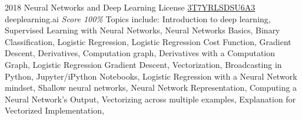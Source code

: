 \documentclass[11pt,a4paper]{moderncv}
\begin{document}
\cventry
    {2018}
    {Neural Networks and Deep Learning}
    {License
        \href{https://www.coursera.org/account/accomplishments/records/T7YRLSDSU6A}
        {3T7YRLSDSU6A3}
    }
    {deeplearning.ai}
    {\textit{Score 100\%}}
    {
        Topics include:                                                          %
            Introduction to deep learning,                                                          %
            Supervised Learning with Neural Networks,                                                          %
            Neural Networks Basics,                                                          %
            Binary Classification,                                                          %
            Logistic Regression,                                                          %
            Logistic Regression Cost Function,                                                          %
            Gradient Descent,                                                          %
            Derivatives,                                                          %
            Computation graph,                                                          %
            Derivatives with a Computation Graph,                                                          %
            Logistic Regression Gradient Descent,                                                          %
            Vectorization,                                                          %
            Broadcasting in Python,                                                          %
            Jupyter/iPython Notebooks,                                                          %
            Logistic Regression with a Neural Network mindset,                                                          %
            Shallow neural networks,                                                          %
            Neural Network Representation,                                                          %
            Computing a Neural Network's Output,                                                          %
            Vectorizing across multiple examples,                                                          %
            Explanation for Vectorized Implementation,                                                          %
}
\end{document}
